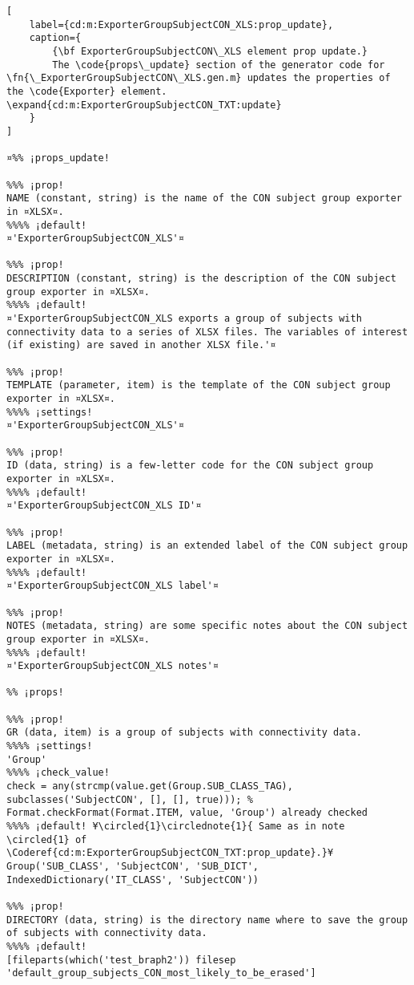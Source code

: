 \documentclass{tufte-handout}
\begin{document}
\begin{lstlisting}[
	label={cd:m:ExporterGroupSubjectCON_XLS:prop_update},
	caption={
		{\bf ExporterGroupSubjectCON\_XLS element prop update.}
		The \code{props\_update} section of the generator code for \fn{\_ExporterGroupSubjectCON\_XLS.gen.m} updates the properties of the \code{Exporter} element. \expand{cd:m:ExporterGroupSubjectCON_TXT:update}
	}
]

¤%% ¡props_update!

%%% ¡prop!
NAME (constant, string) is the name of the CON subject group exporter in ¤XLSX¤.
%%%% ¡default!
¤'ExporterGroupSubjectCON_XLS'¤

%%% ¡prop!
DESCRIPTION (constant, string) is the description of the CON subject group exporter in ¤XLSX¤.
%%%% ¡default!
¤'ExporterGroupSubjectCON_XLS exports a group of subjects with connectivity data to a series of XLSX files. The variables of interest (if existing) are saved in another XLSX file.'¤

%%% ¡prop!
TEMPLATE (parameter, item) is the template of the CON subject group exporter in ¤XLSX¤.
%%%% ¡settings!
¤'ExporterGroupSubjectCON_XLS'¤

%%% ¡prop!
ID (data, string) is a few-letter code for the CON subject group exporter in ¤XLSX¤.
%%%% ¡default!
¤'ExporterGroupSubjectCON_XLS ID'¤

%%% ¡prop!
LABEL (metadata, string) is an extended label of the CON subject group exporter in ¤XLSX¤.
%%%% ¡default!
¤'ExporterGroupSubjectCON_XLS label'¤

%%% ¡prop!
NOTES (metadata, string) are some specific notes about the CON subject group exporter in ¤XLSX¤.
%%%% ¡default!
¤'ExporterGroupSubjectCON_XLS notes'¤

%% ¡props!

%%% ¡prop!
GR (data, item) is a group of subjects with connectivity data.
%%%% ¡settings!
'Group'
%%%% ¡check_value!
check = any(strcmp(value.get(Group.SUB_CLASS_TAG), subclasses('SubjectCON', [], [], true))); % Format.checkFormat(Format.ITEM, value, 'Group') already checked
%%%% ¡default! ¥\circled{1}\circlednote{1}{ Same as in note \circled{1} of \Coderef{cd:m:ExporterGroupSubjectCON_TXT:prop_update}.}¥
Group('SUB_CLASS', 'SubjectCON', 'SUB_DICT', IndexedDictionary('IT_CLASS', 'SubjectCON'))

%%% ¡prop!
DIRECTORY (data, string) is the directory name where to save the group of subjects with connectivity data.
%%%% ¡default!
[fileparts(which('test_braph2')) filesep 'default_group_subjects_CON_most_likely_to_be_erased']


\end{lstlisting}
\end{document}
